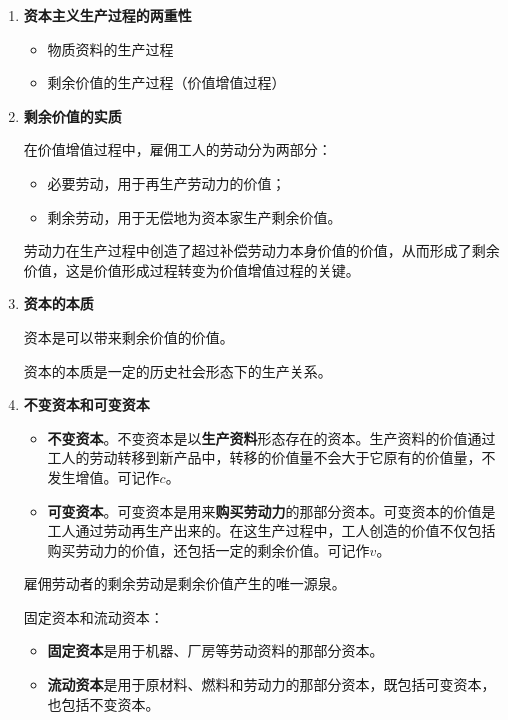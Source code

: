 \documentclass[12pt, a4paper, oneside]{ctexart}
\begin{document}
\begin{enumerate}
  \item {\bf 资本主义生产过程的两重性}
  
  \begin{itemize}
    \item 物质资料的生产过程
    \item 剩余价值的生产过程（价值增值过程）
  \end{itemize}

  \item {\bf 剩余价值的实质}
  
  在价值增值过程中，雇佣工人的劳动分为两部分：
  \begin{itemize}
    \item 必要劳动，用于再生产劳动力的价值；
    \item 剩余劳动，用于无偿地为资本家生产剩余价值。
  \end{itemize}

  劳动力在生产过程中创造了超过补偿劳动力本身价值的价值，从而形成了剩余价值，这是价值形成过程转变为价值增值过程的关键。

  \item {\bf 资本的本质}
  
  资本是可以带来剩余价值的价值。

  资本的本质是一定的历史社会形态下的生产关系。

  \item {\bf 不变资本和可变资本}
  
  \begin{itemize}
    \item {\bf 不变资本}。不变资本是以\textbf{生产资料}形态存在的资本。生产资料的价值通过工人的劳动转移到新产品中，转移的价值量不会大于它原有的价值量，不发生增值。可记作$c$。
    \item {\bf 可变资本}。可变资本是用来\textbf{购买劳动力}的那部分资本。可变资本的价值是工人通过劳动再生产出来的。在这生产过程中，工人创造的价值不仅包括购买劳动力的价值，还包括一定的剩余价值。可记作$v$。
  \end{itemize}

  雇佣劳动者的剩余劳动是剩余价值产生的唯一源泉。

  固定资本和流动资本：
  \begin{itemize}
    \item {\bf 固定资本}是用于机器、厂房等劳动资料的那部分资本。
    \item {\bf 流动资本}是用于原材料、燃料和劳动力的那部分资本，既包括可变资本，也包括不变资本。
  \end{itemize}


\end{enumerate}
\end{document}
